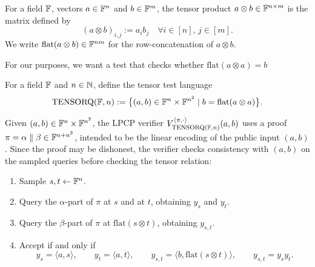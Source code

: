For a field \(\mathbb{F}\), vectors \(a \in \mathbb{F}^n\) and \(b \in \mathbb{F}^m\), the tensor product \(a \otimes b \in \mathbb{F}^{n \times m}\)
is the matrix defined by
\[
  (a \otimes b)_{i,j} := a_i b_j \quad \forall i \in [n],\, j \in [m].
\]
We write \(\mathrm{flat}(a \otimes b) \in \mathbb{F}^{nm}\) for the row-concatenation of \(a \otimes b\).

For our purposes, we want a test that checks whether $\mathrm{flat}(a \otimes a) = b$

\begin{definition}\label{TENSORQ}\leanok
For a field \(\mathbb{F}\) and \(n \in \mathbb{N}\), define the tensor test language
\[
  \mathrm{TENSORQ}(\mathbb{F}, n) :=
    \bigl\{ (a, b) \in \mathbb{F}^n \times \mathbb{F}^{n^2} \mid b = \mathrm{flat}(a \otimes a) \bigr\}.
\]
\end{definition}

\begin{definition}\label{TENSORQ.verifier}\leanok
Given \((a,b) \in \mathbb{F}^n \times \mathbb{F}^{n^2}\), the LPCP verifier
\(V_{\mathrm{TENSORQ}(\mathbb{F},n)}^{\langle \pi,\cdot\rangle}(a,b)\) uses a proof
\(\pi=\alpha\parallel\beta \in \mathbb{F}^{n+n^2}\), intended to be the linear encoding of the public input
\((a,b)\). Since the proof may be dishonest, the verifier checks consistency with \((a,b)\) on the sampled
queries before checking the tensor relation:
\begin{enumerate}
  \item Sample \(s,t \leftarrow \mathbb{F}^n\).
  \item Query the \(\alpha\)-part of \(\pi\) at \(s\) and at \(t\), obtaining \(y_s\) and \(y_t\).
  \item Query the \(\beta\)-part of \(\pi\) at \(\mathrm{flat}(s\otimes t)\), obtaining \(y_{s,t}\).
  \item Accept if and only if
  \[
      y_s=\langle a,s\rangle,\qquad
      y_t=\langle a,t\rangle,\qquad
      y_{s,t}=\langle b,\mathrm{flat}(s\otimes t)\rangle,\qquad
      y_{s,t}=y_s y_t.
    \]
\end{enumerate}
\end{definition}


